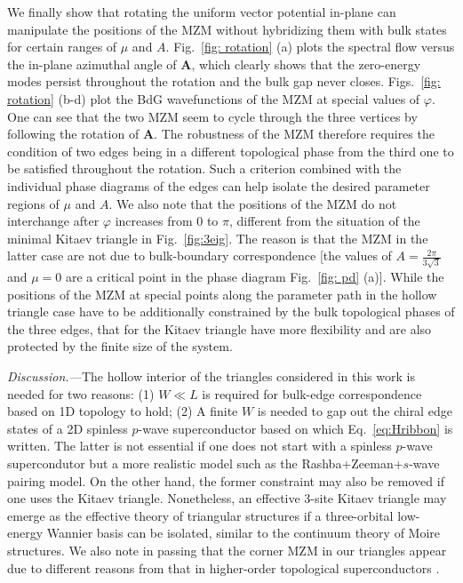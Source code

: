 \documentclass[aps,prb,showpacs,amsmath,twocolumn,amssymb,superscriptaddress]{revtex4-2}
\begin{document}
We finally show that rotating the uniform vector potential in-plane can manipulate the positions of the MZM without hybridizing them with bulk states for certain ranges of $\mu$ and $A$. Fig.~\ref{fig: rotation} (a) plots the spectral flow versus the in-plane azimuthal angle of $\mathbf A$, which clearly shows that the zero-energy modes persist throughout the rotation and the bulk gap never closes. Figs.~\ref{fig: rotation} (b-d) plot the BdG wavefunctions of the MZM at special values of $\varphi$. One can see that the two MZM seem to cycle through the three vertices by following the rotation of $\bm A$. The robustness of the MZM therefore requires the condition of two edges being in a different topological phase from the third one to be satisfied throughout the rotation. Such a criterion combined with the individual phase diagrams of the edges can help isolate the desired parameter regions of $\mu$ and $A$. We also note that the positions of the MZM do not interchange after $\varphi$ increases from 0 to $\pi$, different from the situation of the minimal Kitaev triangle in Fig.~\ref{fig:3eig}. The reason is that the MZM in the latter case are not due to bulk-boundary correspondence [the values of $A = \frac{2\pi}{3\sqrt{3}}$ and $\mu=0$ are a critical point in the phase diagram Fig.~\ref{fig: pd} (a)]. While the positions of the MZM at special points along the parameter path in the hollow triangle case have to be additionally constrained by the bulk topological phases of the three edges, that for the Kitaev triangle have more flexibility and are also protected by the finite size of the system.

\emph{Discussion.---}The hollow interior of the triangles considered in this work is needed for two reasons: (1) $W\ll L$ is required for bulk-edge correspondence based on 1D topology to hold; (2) A finite $W$ is needed to gap out the chiral edge states of a 2D spinless $p$-wave superconductor based on which Eq.~\eqref{eq:Hribbon} is written. The latter is not essential if one does not start with a spinless $p$-wave supercondutor but a more realistic model such as the Rashba+Zeeman+$s$-wave pairing model. On the other hand, the former constraint may also be removed if one uses the Kitaev triangle. Nonetheless, an effective 3-site Kitaev triangle may emerge as the effective theory of triangular structures if a three-orbital low-energy Wannier basis can be isolated, similar to the continuum theory of Moire structures. We also note in passing that the corner MZM in our triangles appear due to different reasons from that in higher-order topological superconductors \cite{wangEvidenceMajoranaBound2018,pahomiBraidingMajoranaCorner2020}.
\end{document}
